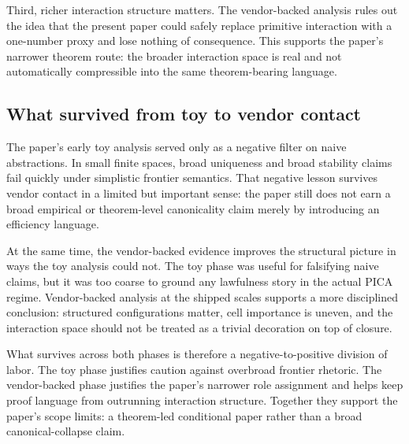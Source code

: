 Third, richer interaction structure matters. The vendor-backed analysis rules
out the idea that the present paper could safely replace primitive interaction
with a one-number proxy and lose nothing of consequence. This supports the
paper's narrower theorem route: the broader interaction space is real and not
automatically compressible into the same theorem-bearing language.

\subsection*{What survived from toy to vendor contact}

The paper's early toy analysis served only as a negative filter on naive
abstractions. In small finite spaces, broad uniqueness and broad stability
claims fail quickly under simplistic frontier semantics. That negative lesson
survives vendor contact in a limited but important sense: the paper still does
not earn a broad empirical or theorem-level canonicality claim merely by
introducing an efficiency language.

At the same time, the vendor-backed evidence improves the structural picture in
ways the toy analysis could not. The toy phase was useful for falsifying naive
claims, but it was too coarse to ground any lawfulness story in the actual PICA
regime. Vendor-backed analysis at the shipped scales supports a more disciplined
conclusion: structured configurations matter, cell importance is uneven, and the
interaction space should not be treated as a trivial decoration on top of
closure.

What survives across both phases is therefore a negative-to-positive division of
labor. The toy phase justifies caution against overbroad frontier rhetoric. The
vendor-backed phase justifies the paper's narrower role assignment and helps
keep proof language from outrunning interaction structure. Together they
support the paper's scope limits: a theorem-led conditional paper rather than a
broad canonical-collapse claim.

